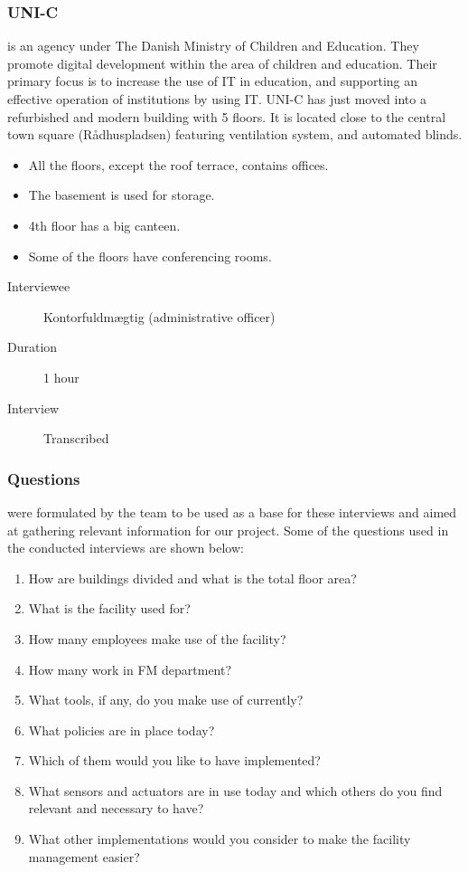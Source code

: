 \subsubsection{UNI-C} is an agency under The Danish Ministry of Children and Education. They promote digital development within the area of children and education. Their primary focus is to increase the use of IT in education, and supporting an effective operation of institutions by using IT. UNI-C has just moved into a refurbished and modern building with 5 floors. It is located close to the central town square (R\aa dhuspladsen) featuring ventilation system, and automated blinds.
\begin{itemize}
	\item All the floors, except the roof terrace, contains offices.
	\item The basement is used for storage.
	\item 4th floor has a big canteen.
	\item Some of the floors have conferencing rooms.
\end{itemize}
\begin{description}
	\item[Interviewee] Kontorfuldmægtig (administrative officer)
	\item[Duration] 1 hour
	\item[Interview] Transcribed
\end{description}

\subsubsection{Questions} were formulated by the team to be used as a base for these interviews and aimed at gathering relevant information for our project. Some of the questions used in the conducted interviews are shown below:
\begin{enumerate}
	\item How are buildings divided and what is the total floor area?
	\item What is the facility used for? 
	\item How many employees make use of the facility?
	\item How many work in FM department?
	\item What tools, if any, do you make use of currently?
	\item What policies are in place today?
	\item Which of them would you like to have implemented?
	\item What sensors and actuators are in use today and which others do you find relevant and necessary to have?
	\item What other implementations would you consider to make the facility management easier?
\end{enumerate}

